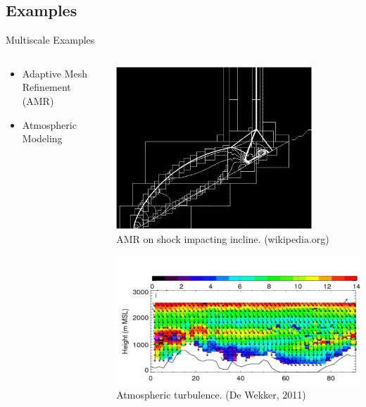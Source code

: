 \documentclass{beamer}
\begin{document}
	\subsection{Examples}
	\begin{frame}[t]{Multiscale Examples}
		\begin{columns}[T]
			\begin{column}{0.6\textwidth}
				\begin{itemize}
					\item  Adaptive Mesh Refinement (AMR)
					\vspace{8em}
					\item  Atmospheric Modeling
				\end{itemize}
			\end{column}
			
			\begin{column}{0.5\textwidth}
				\begin{center}
					\vspace{-1em}
					\includegraphics[width=0.8\textwidth]{Amrgridimg.jpg}
					\\\tiny AMR on shock impacting incline. (wikipedia.org)
				\end{center}
				\vspace{-1.5em}\hspace{-1.cm}\includegraphics[width=1.1\textwidth]{atmospheric.png}
				\centering\\\tiny Atmospheric turbulence. (De Wekker, 2011)
			\end{column}
		\end{columns}
	\end{frame}
	
\end{document}
